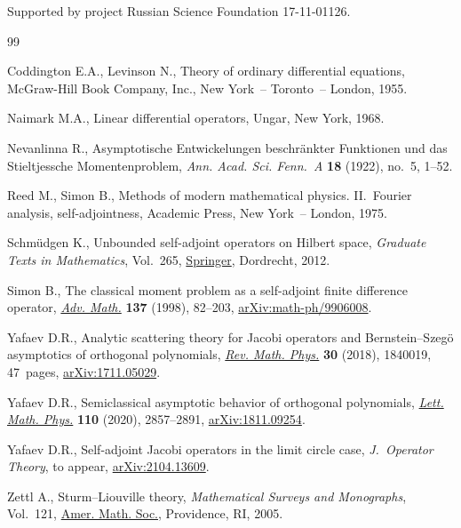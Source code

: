 \documentclass[10pt,a4paper]{amsart}
\numberwithin{equation}{section}
\begin{document}
 Supported by project Russian Science Foundation 17-11-01126.


\begin{thebibliography}{99}
\footnotesize\itemsep=0pt

Coddington E.A., Levinson N., Theory of ordinary differential equations,
 McGraw-Hill Book Company, Inc., New York~-- Toronto~-- London, 1955.

Naimark M.A., Linear differential operators, Ungar, New York, 1968.

Nevanlinna R., Asymptotische Entwickelungen beschr\"ankter Funktionen und das
 Stieltjessche Momentenproblem, \textit{Ann. Acad. Sci. Fenn.~A} \textbf{18}
 (1922), no.~5, 1--52.

Reed M., Simon B., Methods of modern mathematical physics. {II}.~Fourier
 analysis, self-adjointness, Academic Press, New York~-- London, 1975.

Schm\"udgen K., Unbounded self-adjoint operators on {H}ilbert space,
 \textit{Graduate Texts in Mathematics}, Vol.~265, \href{https://doi.org/10.1007/978-94-007-4753-1}{Springer}, Dordrecht, 2012.

Simon B., The classical moment problem as a self-adjoint finite difference
 operator, \href{https://doi.org/10.1006/aima.1998.1728}{\textit{Adv. Math.}} \textbf{137} (1998), 82--203,
 \href{https://arxiv.org/abs/math-ph/9906008}{arXiv:math-ph/9906008}.

Yafaev D.R., Analytic scattering theory for {J}acobi operators and
 {B}ernstein--{S}zeg\"{o} asymptotics of orthogonal polynomials, \href{https://doi.org/10.1142/S0129055X18400196}{\textit{Rev.
 Math. Phys.}} \textbf{30} (2018), 1840019, 47~pages, \href{https://arxiv.org/abs/1711.05029}{arXiv:1711.05029}.

Yafaev D.R., Semiclassical asymptotic behavior of orthogonal polynomials,
 \href{https://doi.org/10.1007/s11005-020-01313-w}{\textit{Lett. Math. Phys.}} \textbf{110} (2020), 2857--2891,
 \href{https://arxiv.org/abs/1811.09254}{arXiv:1811.09254}.

Yafaev D.R., Self-adjoint {J}acobi operators in the limit circle case,
 \textit{J.~Operator Theory}, {t}o appear, \href{https://arxiv.org/abs/2104.13609}{arXiv:2104.13609}.

Zettl A., Sturm--{L}iouville theory, \textit{Mathematical Surveys and
 Monographs}, Vol.~121, \href{https://doi.org/10.1090/surv/121}{Amer. Math. Soc.}, Pro\-vidence, RI, 2005.

\end{thebibliography}
\end{document}
